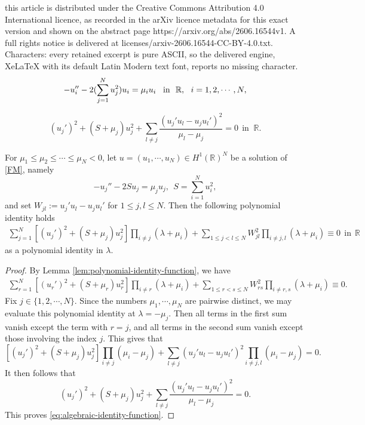 \documentclass[10pt,a4paper]{amsart}
\newcommand{\R}{{\mathbb{R}}}
\begin{document}
this article is distributed under the Creative Commons Attribution 4.0 International licence, as recorded in the arXiv licence metadata for this exact version and shown on the abstract page https://arxiv.org/abs/2606.16544v1. A full rights notice is delivered at licenses/arxiv-2606.16544-CC-BY-4.0.txt. Characters: every retained excerpt is pure ASCII, so the delivered engine, XeLaTeX with its default Latin Modern text font, reports no missing character.
\begin{equation}\label{FM}
-u''_i-2(\sum_{j=1}^N u^2_j)u_i=\mu_iu_i\ \,\ \hbox{in }\ \R,\ \ i=1,2,\cdots,N,
\end{equation}

\begin{equation}\label{eq:algebraic-identity-function}
	(u_j')^2+(S+\mu_j)u_j^2
	+
	\sum_{l\neq j}
	\frac{(u_j'u_l-u_ju_l')^2}{\mu_l-\mu_j}
	=0
	\ \ \text{in }\ \mathbb R.
\end{equation}

\begin{lemma}\label{lem:polynomial-identity-function}
For $\mu_1\leq \mu_2\leq\cdots\leq \mu_N<0$, let \(u=(u_1,\cdots,u_N)\in H^1(\mathbb R)^N\) be a solution of
\eqref{FM}, namely
\[
-u_j''-2Su_j=\mu_j u_j,\ \
S=\sum_{i=1}^N u_i^2 ,
\]
and set
$
W_{jl}:=u_j'u_l-u_j u_l'$ for $1\leq j,l\leq N$. Then the following polynomial identity holds
	\begin{equation}\label{eq:polynomial-identity-function}
		\begin{split}
			\sum_{j=1}^N
			\left[
			(u_j')^2+(S+\mu_j)u_j^2
			\right]
			\prod_{i\neq j}(\lambda+\mu_i)
			+
			\sum_{1\leq j<l\leq N}
			W_{jl}^2
			\prod_{i\neq j,l}(\lambda+\mu_i)
			\equiv 0 \ \ \text{in} \ \ \R
		\end{split}
	\end{equation}
	as a polynomial identity in \(\lambda\).
\end{lemma}

\begin{proof}
By Lemma \ref{lem:polynomial-identity-function}, we have
\[
\begin{split}
	\sum_{r=1}^N
	\left[
	(u_r')^2+(S+\mu_r)u_r^2
	\right]
	\prod_{i\neq r}(\lambda+\mu_i)
	+
	\sum_{1\leq r<s\leq N}
	W_{rs}^2
	\prod_{i\neq r,s}(\lambda+\mu_i)
	\equiv0 .
\end{split}
\]
Fix \(j\in\{1,2,\cdots,N\}\). Since the numbers
\(\mu_1,\cdots,\mu_N\) are pairwise distinct, we may evaluate this
polynomial identity at \(\lambda=-\mu_j\). Then all terms in the
first sum vanish except the term with \(r=j\), and all terms in the
second sum vanish except those involving the index \(j\). This gives that
\[
\left[
(u_j')^2+(S+\mu_j)u_j^2
\right]
\prod_{i\neq j}(\mu_i-\mu_j)
+
\sum_{l\neq j}
(u_j'u_l-u_ju_l')^2
\prod_{i\neq j,l}(\mu_i-\mu_j)
=0.
\]
It then follows that
\[
(u_j')^2+(S+\mu_j)u_j^2
+
\sum_{l\neq j}
\frac{(u_j'u_l-u_ju_l')^2}{\mu_l-\mu_j}
=0.
\]
This proves \eqref{eq:algebraic-identity-function}.
\end{proof}
\end{document}
